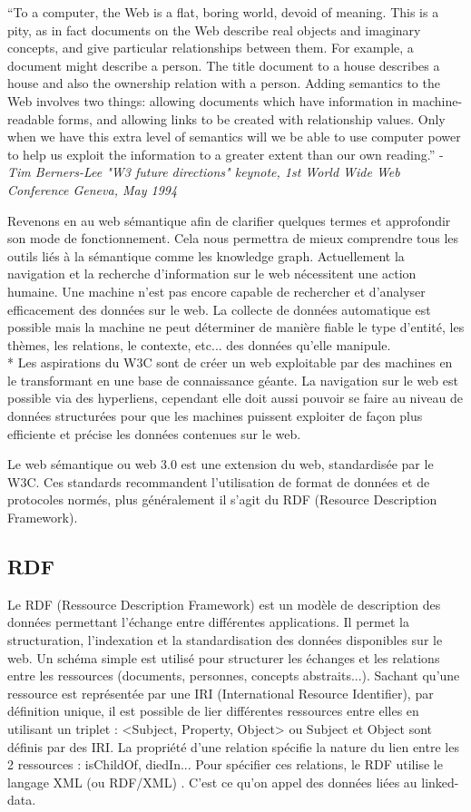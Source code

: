 \enquote{To a computer, the Web is a flat, boring world, devoid of meaning. This is a pity, as in fact documents on the Web describe real objects and imaginary concepts, and give particular relationships between them. For example, a document might describe a person. The title document to a house describes a house and also the ownership relation with a person. Adding semantics to the Web involves two things: allowing documents which have information in machine-readable forms, and allowing links to be created with relationship values. Only when we have this extra level of semantics will we be able to use computer power to help us exploit the information to a greater extent than our own reading.} - \textit{Tim Berners-Lee "W3 future directions" keynote, 1st World Wide Web Conference Geneva, May 1994} \cite{tim}

Revenons en au web sémantique afin de clarifier quelques termes et approfondir son mode de fonctionnement. Cela nous permettra de mieux comprendre tous les outils liés à la sémantique comme les knowledge graph. Actuellement la navigation et la recherche d'information sur le web nécessitent une action humaine. Une machine n'est pas encore capable de rechercher et d'analyser efficacement des données sur le web. La collecte de données automatique est possible mais la machine ne peut déterminer de manière fiable le type d'entité, les thèmes, les relations, le contexte, etc... des données qu'elle manipule.
\\*
Les aspirations du W3C sont de créer un web exploitable par des machines en le transformant en une base de connaissance géante.
La navigation sur le web est possible via des hyperliens, cependant elle doit aussi pouvoir se faire au niveau de données structurées pour que les machines puissent exploiter de façon plus efficiente et précise les données contenues sur le web.

Le web sémantique ou web 3.0 est une extension du web, standardisée par le W3C. Ces standards recommandent l'utilisation de format de données et de protocoles normés, plus généralement il s'agit du RDF (Resource Description Framework).

\subsection{RDF}

Le RDF (Ressource Description Framework) est un modèle de description des données permettant l'échange entre différentes applications. Il permet la structuration, l'indexation et la standardisation des données disponibles sur le web. Un schéma simple est utilisé pour structurer les échanges et les relations entre les ressources (documents, personnes, concepts abstraits...). Sachant qu'une ressource est représentée par une IRI (International Resource Identifier), par définition unique, il est possible de lier différentes ressources entre elles en utilisant un triplet : <Subject, Property, Object> ou Subject et Object sont définis par des IRI. La propriété d'une relation spécifie la nature du lien entre les 2 ressources : isChildOf, diedIn... Pour spécifier ces relations, le RDF utilise le langage XML (ou RDF/XML) \cite{rdf}. C'est ce qu'on appel des données liées au linked-data.

